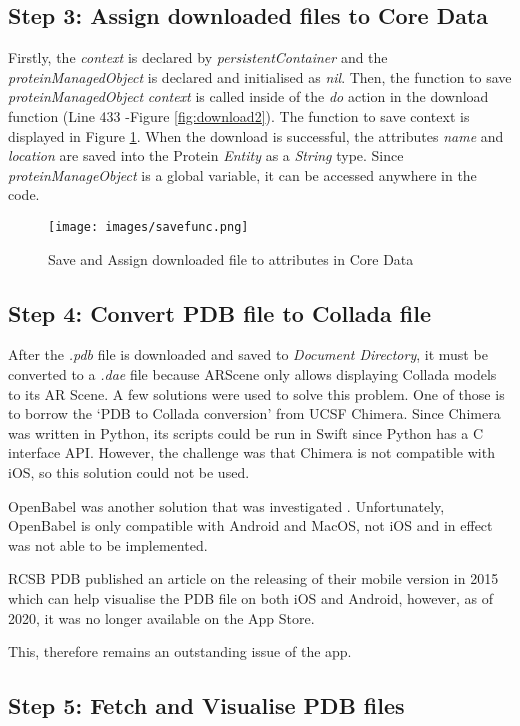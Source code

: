 \subsection{Step 3: Assign downloaded files to Core Data}
Firstly, the \emph{context} is declared by \emph{persistentContainer} and the \emph{proteinManagedObject} is declared and initialised as \emph{nil}. 
Then, the function to save \emph{proteinManagedObject} \emph{context} is called inside of the \emph{do} action in the download function (Line 433 -Figure \ref{fig:download2}). The function to save context is displayed in Figure \ref{fig:savefunc}. 
When the download is successful, the attributes \emph{name} and \emph{location} are saved into the Protein \emph{Entity} as a \emph{String} type. 
Since \emph{proteinManageObject} is a global variable, it can be accessed anywhere in the code. 
 \begin{figure}[!htp]
	\centering
	\texttt{[image: images/savefunc.png]}
	\caption{Save and Assign downloaded file to attributes in Core Data}
	\label{fig:savefunc}
\end{figure}

\subsection{Step 4: Convert PDB file to Collada file}
After the \emph{.pdb} file is downloaded and saved to \emph{Document Directory}, it must be converted to a \emph{.dae} file because ARScene only allows displaying Collada models to its AR Scene. 
A few solutions were used to solve this problem. One of those is to borrow the `PDB to Collada conversion' from UCSF Chimera. Since Chimera was written in Python, its scripts could be run in Swift since Python has a C interface API. However, the challenge was that Chimera is not compatible with iOS, so this solution could not be used. 

OpenBabel was another solution that was investigated . Unfortunately, OpenBabel is only compatible with Android and MacOS, not iOS and in effect was not able to be implemented. 

RCSB PDB published an article on the releasing of their mobile version in 2015 which can help visualise the PDB file on both iOS and Android, however, as of 2020, it was no longer available on the App Store.

This, therefore remains an outstanding issue of the app.

\subsection{Step 5: Fetch and Visualise PDB files}

